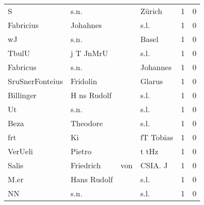 \begin{center}
\begin{tiny}
\begin{longtabu}{llllrr}
                        S &                               s.n. &             &                                      Zürich &          1 &         0 \\
                Fabricius &                           Johahnes &             &                                        s.l. &          1 &         0 \\
                       wJ &                               s.n. &             &                                       Basel &          1 &         0 \\
                    TbulU &                          j T JnMrU &             &                                        s.l. &          1 &         0 \\
                 Fabricus &                               s.n. &             &                                    Johannes &          1 &         0 \\
          SruSnerFonteius &                           Fridolin &             &                                      Glarus &          1 &         0 \\
                Billinger &                        H ns Rudolf &             &                                        s.l. &          1 &         0 \\
                       Ut &                               s.n. &             &                                        s.l. &          1 &         0 \\
                     Beza &                           Theodore &             &                                        s.l. &          1 &         0 \\
                      frt &                                 Ki &             &                                   fT Tobias &          1 &         0 \\
                  VerUeli &                             Pietro &             &                                       t tHz &          1 &         0 \\
                    Salis &                          Friedrich &         von &                                     CSIA. J &          1 &         0 \\
                     M.er &                        Hans Rudolf &             &                                        s.l. &          1 &         0 \\
                       NN &                               s.n. &             &                                        s.l. &          1 &         0 \\

\end{longtabu}
\end{tiny}
\end{center}
